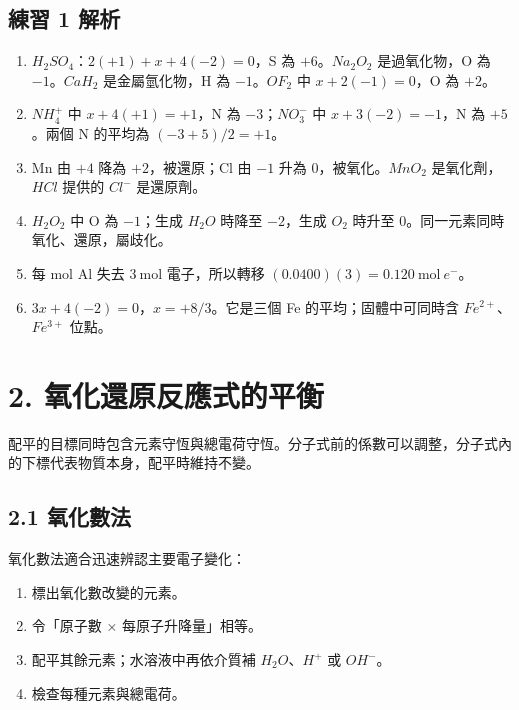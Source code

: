 \documentclass[11pt,a4paper]{article}
\providecommand{\tightlist}{%
  \setlength{\itemsep}{0pt}\setlength{\parskip}{0pt}}
\begin{document}
\subsection{練習 1 解析}\label{ux7df4ux7fd2-1-ux89e3ux6790}

\begin{enumerate}
\def\labelenumi{\arabic{enumi}.}
\tightlist
\item
  \(H_2SO_4\)：\(2(+1)+x+4(-2)=0\)，S 為 \(+6\)。\(Na_2O_2\) 是過氧化物，O 為 \(-1\)。\(CaH_2\) 是金屬氫化物，H 為 \(-1\)。\(OF_2\) 中 \(x+2(-1)=0\)，O 為 \(+2\)。
\item
  \(NH_4^+\) 中 \(x+4(+1)=+1\)，N 為 \(-3\)；\(NO_3^-\) 中 \(x+3(-2)=-1\)，N 為 \(+5\)。兩個 N 的平均為 \((-3+5)/2=+1\)。
\item
  Mn 由 \(+4\) 降為 \(+2\)，被還原；Cl 由 \(-1\) 升為 \(0\)，被氧化。\(MnO_2\) 是氧化劑，\(HCl\) 提供的 \(Cl^-\) 是還原劑。
\item
  \(H_2O_2\) 中 O 為 \(-1\)；生成 \(H_2O\) 時降至 \(-2\)，生成 \(O_2\) 時升至 \(0\)。同一元素同時氧化、還原，屬歧化。
\item
  每 mol Al 失去 \(3\ \mathrm{mol}\) 電子，所以轉移 \((0.0400)(3)=0.120\ \mathrm{mol}\ e^-\)。
\item
  \(3x+4(-2)=0\)，\(x=+8/3\)。它是三個 Fe 的平均；固體中可同時含 \(Fe^{2+}\)、\(Fe^{3+}\) 位點。
\end{enumerate}

\section{2. 氧化還原反應式的平衡}\label{ux6c27ux5316ux9084ux539fux53cdux61c9ux5f0fux7684ux5e73ux8861}

配平的目標同時包含元素守恆與總電荷守恆。分子式前的係數可以調整，分子式內的下標代表物質本身，配平時維持不變。

\subsection{2.1 氧化數法}\label{ux6c27ux5316ux6578ux6cd5}

氧化數法適合迅速辨認主要電子變化：

\begin{enumerate}
\def\labelenumi{\arabic{enumi}.}
\tightlist
\item
  標出氧化數改變的元素。
\item
  令「原子數 × 每原子升降量」相等。
\item
  配平其餘元素；水溶液中再依介質補 \(H_2O\)、\(H^+\) 或 \(OH^-\)。
\item
  檢查每種元素與總電荷。
\end{enumerate}
\end{document}
